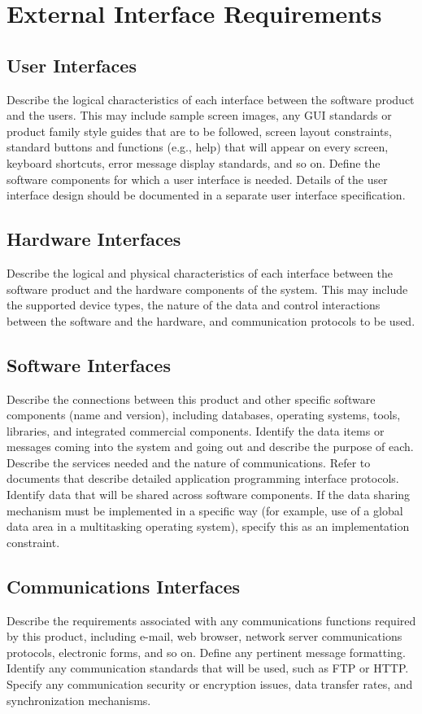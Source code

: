 \chapter{External Interface Requirements}


\section{User Interfaces}

Describe the logical characteristics of each interface between the
software product and the users. This may include sample screen images,
any GUI standards or product family style guides that are to be
followed, screen layout constraints, standard buttons and functions
(e.g., help) that will appear on every screen, keyboard shortcuts,
error message display standards, and so on. Define the software
components for which a user interface is needed. Details of the user
interface design should be documented in a separate user interface
specification.

\section{Hardware Interfaces}

Describe the logical and physical characteristics of each interface
between the software product and the hardware components of the
system. This may include the supported device types, the nature of the
data and control interactions between the software and the hardware,
and communication protocols to be used.

\section{Software Interfaces}

Describe the connections between this product and other specific
software components (name and version), including databases, operating
systems, tools, libraries, and integrated commercial
components. Identify the data items or messages coming into the system
and going out and describe the purpose of each. Describe the services
needed and the nature of communications. Refer to documents that
describe detailed application programming interface
protocols. Identify data that will be shared across software
components. If the data sharing mechanism must be implemented in a
specific way (for example, use of a global data area in a multitasking
operating system), specify this as an implementation constraint.

\section{Communications Interfaces}

Describe the requirements associated with any communications functions
required by this product, including e-mail, web browser, network
server communications protocols, electronic forms, and so on. Define
any pertinent message formatting. Identify any communication standards
that will be used, such as FTP or HTTP. Specify any communication
security or encryption issues, data transfer rates, and
synchronization mechanisms.
